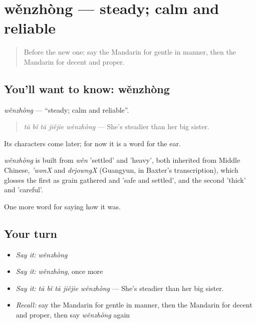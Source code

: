 \section[wěnzhòng]{wěnzhòng — steady; calm and reliable}

\label{lesson:ZH-C469-wenzhong}



\begin{quote}
Before the new one: say the Mandarin for gentle in manner, then the Mandarin for decent and proper.
\end{quote}

\subsection*{You'll want to know: wěnzhòng}
\emph{wěnzhòng} — \textquotedblleft{}steady; calm and reliable\textquotedblright{}.

\begin{quote}
\emph{tā bǐ tā jiějie wěnzhòng} — She's steadier than her big sister.
\end{quote}

Its characters come later; for now it is a word for the ear.

\begin{cousinweb}
\emph{wěnzhòng} is built from \emph{wěn} 'settled' and  'heavy', both inherited from Middle Chinese, \emph{'wonX} and \emph{drjowngX} (Guangyun, in Baxter's transcription), which glosses the first as grain gathered and 'safe and settled', and the second 'thick' and 'careful'.
\end{cousinweb}

\begin{grammarlens}[title={What you've built}]
One more word for saying how it was.
\end{grammarlens}

\subsection*{Your turn}
\begin{itemize}
\raggedright
  \item \emph{Say it:} \emph{wěnzhòng}
  \item \emph{Say it:} \emph{wěnzhòng}, once more
  \item \emph{Say it:} \emph{tā bǐ tā jiějie wěnzhòng} — She's steadier than her big sister.
  \item \emph{Recall:} say the Mandarin for gentle in manner, then the Mandarin for decent and proper, then say \emph{wěnzhòng} again
\end{itemize}

